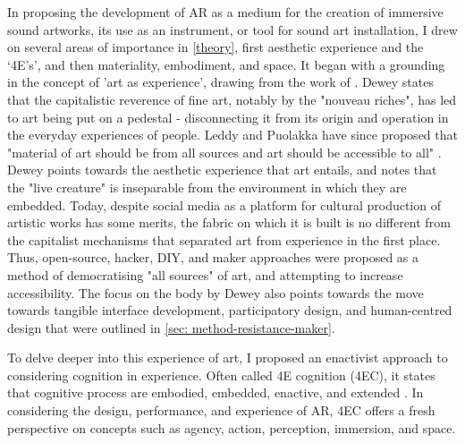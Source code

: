 In proposing the development of AR as a medium for the creation of immersive sound artworks, its use as an instrument, or tool for sound art installation, I drew on several areas of importance in \autoref{theory}, first aesthetic experience and the `4E's', and then materiality, embodiment, and space. It began with a grounding in the concept of 'art as experience', drawing from the work of \citep{dewey1934}. Dewey states that the capitalistic reverence of fine art, notably by the "nouveau riches", has led to art being put on a pedestal - disconnecting it from its origin and operation in the everyday experiences of people. Leddy and Puolakka have since proposed that "material of art should be from all sources and art should be accessible to all" \citeyearpar{leddy2021}. Dewey points towards the aesthetic experience that art entails, and notes that the "live creature" is inseparable from the environment in which they are embedded. Today, despite social media as a platform for cultural production of artistic works has some merits, the fabric on which it is built is no different from the capitalist mechanisms that separated art from experience in the first place. Thus, open-source, hacker, DIY, and maker approaches were proposed as a method of democratising "all sources" of art, and attempting to increase accessibility. The focus on the body by Dewey also points towards the move towards tangible interface development, participatory design, and human-centred design that were outlined in \autoref{sec: method-resistance-maker}.

To delve deeper into this experience of art, I proposed an enactivist approach to considering cognition in experience. Often called 4E cognition (4EC), it states that cognitive process are embodied, embedded, enactive, and extended \citep{gallagher2017}. In considering the design, performance, and experience of AR, 4EC offers a fresh perspective on concepts such as agency, action, perception, immersion, and space.


